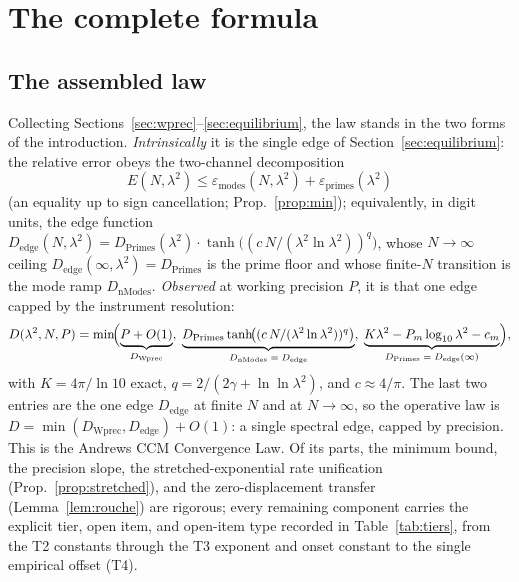 \documentclass[11pt,a4paper]{article}
\begin{document}
\section{The complete formula}\label{sec:complete}

\subsection{The assembled law}\label{ssec:assembled}

Collecting Sections~\ref{sec:wprec}--\ref{sec:equilibrium}, the law stands in the
two forms of the introduction. \emph{Intrinsically} it is the single edge of
Section~\ref{sec:equilibrium}: the relative error obeys the two-channel
decomposition
\begin{equation}\label{eq:complete-intrinsic}
  E(N,\lambda^2)\le\varepsilon_{\mathrm{modes}}(N,\lambda^2)
                +\varepsilon_{\mathrm{primes}}(\lambda^2)
\end{equation}
(an equality up to sign cancellation; Prop.~\ref{prop:min}); equivalently, in
digit units, the edge function
$D_{\mathrm{edge}}(N,\lambda^2)=D_{\mathrm{Primes}}(\lambda^2)\cdot
\tanh\!\bigl((c\,N/(\lambda^2\ln\lambda^2))^{q}\bigr)$, whose $N\to\infty$ ceiling
$D_{\mathrm{edge}}(\infty,\lambda^2)=D_{\mathrm{Primes}}$ is the prime floor and
whose finite-$N$ transition is the mode ramp $D_{\mathrm{nModes}}$.
\emph{Observed} at working precision $P$, it is that one edge capped by the
instrument resolution:
\begin{equation}\label{eq:complete}
  D(\lambda^2,N,P)=\min\!\Bigl(
  \underbrace{P+O(1)}_{D_{\mathrm{Wprec}}},\;
  \underbrace{D_{\mathrm{Primes}}\tanh\!\bigl((c\,N/(\lambda^2\ln\lambda^2))^{q}\bigr)}_{D_{\mathrm{nModes}}\;=\;D_{\mathrm{edge}}},\;
  \underbrace{K\lambda^2-P_m\log_{10}\lambda^2-c_m}_{D_{\mathrm{Primes}}\;=\;D_{\mathrm{edge}}(\infty)}
  \Bigr),
\end{equation}
with $K=4\pi/\ln10$ exact, $q=2/(2\gamma+\ln\ln\lambda^2)$, and $c\approx4/\pi$.
The last two entries are the one edge $D_{\mathrm{edge}}$ at finite $N$ and at
$N\to\infty$, so the operative law is $D=\min(D_{\mathrm{Wprec}},
D_{\mathrm{edge}})+O(1)$: a single spectral edge, capped by precision. This is
the Andrews CCM Convergence Law. Of its parts, the minimum bound, the
precision slope, the stretched-exponential rate unification
(Prop.~\ref{prop:stretched}), and the zero-displacement transfer
(Lemma~\ref{lem:rouche}) are rigorous; every remaining component carries the
explicit tier, open item, and open-item type recorded in
Table~\ref{tab:tiers}, from the T2 constants through the T3 exponent and onset
constant to the single empirical offset (T4).
\end{document}
